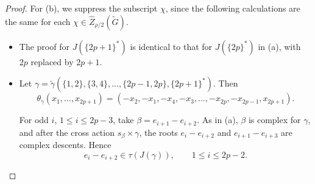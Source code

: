 \documentclass{amsart}
\theoremstyle{definition}
\newcommand{\tu}{\widetilde}
\begin{document}
\begin{proof}

For (b), we suppress the subscript \(\chi\), since the following
calculations are the same for each
\(\chi\in\widehat Z_{\rho/2}(\widetilde G)\).

\begin{itemize}

\item
The proof for \(J(\{2p+1\}^*)\) is identical to that for
\(J(\{2p\}^*)\) in (a), with \(2p\) replaced by \(2p+1\).

\item
Let $\gamma=
\tu\gamma(\{1,2\},\{3,4\},\ldots,
\{2p-1,2p\},\{2p+1\}^*).$
Then
\[
\theta_\gamma(x_1,\ldots,x_{2p+1})
=
(-x_2,-x_1,-x_4,-x_3,\ldots,
-x_{2p},-x_{2p-1},x_{2p+1}).
\]

For odd \(i\), \(1\leq i\leq2p-3\), take
$\beta=e_{i+1}-e_{i+2}.$
As in (a), \(\beta\) is complex for \(\gamma\), and after the cross
action \(s_\beta\times\gamma\), the roots
$e_i-e_{i+2}$ and $e_{i+1}-e_{i+3}$ are complex descents. Hence
\[
e_i-e_{i+2}\in\tau(J(\gamma)),
\qquad 1\leq i\leq2p-2.
\]


\end{itemize}
\end{proof}
\end{document}
